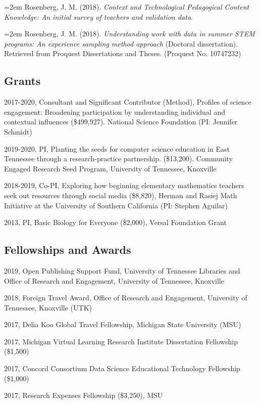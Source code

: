 \documentclass[14,]{article}
\begin{document}
\hangindent=2em Rosenberg, J. M. (2018). \emph{Context and Technological
Pedagogical Content Knowledge: An initial survey of teachers and
validation data}.

\hangindent=2em Rosenberg, J. M. (2018). \emph{Understanding work with
data in summer STEM programs: An experience sampling method approach}
(Doctoral dissertation). Retrieved from Proquest Dissertations and
Theses. (Proquest No. 10747232)

\subsection{Grants}\label{grants}

2017-2020, Consultant and Significant Contributor (Method), Profiles of
science engagement: Broadening participation by understanding individual
and contextual influences (\$499,927). National Science Foundation (PI:
Jennifer Schmidt)

2019-2020, PI, Planting the seeds for computer science education in East
Tennessee through a research-practice partnership. (\$13,200). Community
Engaged Research Seed Program, University of Tennessee, Knoxville

2018-2019, Co-PI, Exploring how beginning elementary mathematics
teachers seek out resources through social media (\$8,820), Herman and
Rasiej Math Initiative at the University of Southern California (PI:
Stephen Aguilar)

2013, PI, Basic Biology for Everyone (\$2,000), Versal Foundation Grant

\subsection{Fellowships and Awards}\label{fellowships-and-awards}

2019, Open Publishing Support Fund, University of Tennessee Libraries
and Office of Research and Engagement, University of Tennessee,
Knoxville

2018, Foreign Travel Award, Office of Research and Engagement,
University of Tennessee, Knoxville (UTK)

2017, Delia Koo Global Travel Fellowship, Michigan State University
(MSU)

2017, Michigan Virtual Learning Research Institute Dissertation
Fellowship (\$1,500)

2017, Concord Consortium Data Science Educational Technology Fellowship
(\$1,000)

2017, Research Expenses Fellowship (\$3,250), MSU
\end{document}
